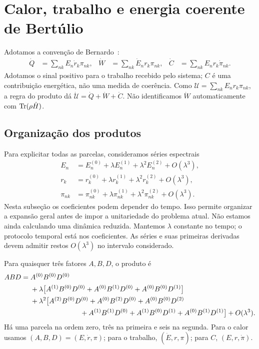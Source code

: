 \section{Calor, trabalho e energia coerente de Bertúlio}
Adotamos a convenção de Bernardo~\cite{Bernardo2020}:
\begin{align}
 \dot Q&=\sum_{nk}E_n\dot r_k\pi_{nk},&
 \dot W&=\sum_{nk}\dot E_nr_k\pi_{nk},&
 \dot C&=\sum_{nk}E_nr_k\dot\pi_{nk}.
 \label{eq:bernardo}
\end{align}
Adotamos o sinal positivo para o trabalho recebido pelo sistema;
$C$ é uma contribuição energética, não uma medida de coerência.
Como $\mathcal U=\sum_{nk}E_nr_k\pi_{nk}$, a regra do produto dá
$\dot{\mathcal U}=\dot Q+\dot W+\dot C$.
Não identificamos $\dot W$ automaticamente com $\operatorname{Tr}(\rho\dot H)$.

\subsection{Organização dos produtos}
Para explicitar todas as parcelas, consideramos séries espectrais
\begin{align}
 E_n&=E_n^{(0)}+\lambda E_n^{(1)}
                      +\lambda^2E_n^{(2)}+O(\lambda^3),\nonumber\\
 r_k&=r_k^{(0)}+\lambda r_k^{(1)}
                      +\lambda^2r_k^{(2)}+O(\lambda^3),\nonumber\\
 \pi_{nk}&=\pi_{nk}^{(0)}+\lambda\pi_{nk}^{(1)}
                      +\lambda^2\pi_{nk}^{(2)}+O(\lambda^3).
 \label{eq:allseries}
\end{align}
Nesta subseção os coeficientes podem depender do tempo.
Isso permite organizar a expansão geral antes de impor a unitariedade
do problema atual. Não estamos ainda calculando uma dinâmica reduzida.
Mantemos $\lambda$ constante no tempo; o protocolo temporal está
nos coeficientes. As séries e suas primeiras derivadas devem admitir
restos $O(\lambda^3)$ no intervalo considerado.

Para quaisquer três fatores $A,B,D$, o produto é
\begin{align}
 ABD={}&A^{(0)}B^{(0)}D^{(0)}\nonumber\\
 &+\lambda\big[A^{(1)}B^{(0)}D^{(0)}
              +A^{(0)}B^{(1)}D^{(0)}
              +A^{(0)}B^{(0)}D^{(1)}\big]\nonumber\\
 &+\lambda^2\big[A^{(2)}B^{(0)}D^{(0)}
              +A^{(0)}B^{(2)}D^{(0)}
              +A^{(0)}B^{(0)}D^{(2)}\nonumber\\
 &\hspace{25mm}+A^{(1)}B^{(1)}D^{(0)}
              +A^{(1)}B^{(0)}D^{(1)}
              +A^{(0)}B^{(1)}D^{(1)}\big]+O(\lambda^3).
 \label{eq:triple}
\end{align}
Há uma parcela na ordem zero, três na primeira e seis na segunda.
Para o calor usamos $(A,B,D)=(E,\dot r,\pi)$;
para o trabalho, $(\dot E,r,\pi)$; para $C$, $(E,r,\dot\pi)$.

